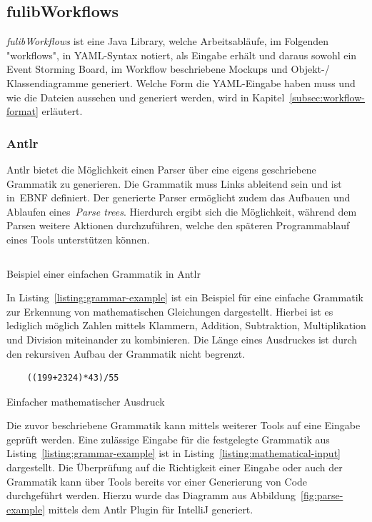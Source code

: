 \subsection{fulibWorkflows}\label{subsec:fulibworkflows}
\textit{fulibWorkflows} ist eine Java Library, welche Arbeitsabläufe, im Folgenden "workflows", in \ac{YAML}-Syntax notiert, als Eingabe erhält und daraus
sowohl ein Event Storming Board, im Workflow beschriebene Mockups und Objekt-/ Klassendiagramme generiert.
Welche Form die YAML-Eingabe haben muss und wie die Dateien aussehen und generiert werden, wird in Kapitel~\ref{subsec:workflow-format} erläutert.

\subsubsection{Antlr}\label{subsubsec:antlr}
\ac{Antlr} bietet die Möglichkeit einen Parser über eine eigens geschriebene Grammatik zu generieren.
Die Grammatik muss Links ableitend sein und ist in~\ac{EBNF} definiert.
Der generierte Parser ermöglicht zudem das Aufbauen und Ablaufen eines~\textit{Parse trees}.
Hierdurch ergibt sich die Möglichkeit, während dem Parsen weitere Aktionen durchzuführen, welche den späteren Programmablauf eines Tools unterstützen können.

\begin{listing}[!ht]
    \inputminted{antlr}{listings/2.2.1/AntlrExample.g4}
    \caption{Beispiel einer einfachen Grammatik in Antlr}
    \label{listing:grammar-example}
\end{listing}

In Listing~\ref{listing:grammar-example} ist ein Beispiel für eine einfache Grammatik zur Erkennung von mathematischen Gleichungen dargestellt.\cite{antlrOrg}
Hierbei ist es lediglich möglich Zahlen mittels Klammern, Addition, Subtraktion, Multiplikation und Division miteinander zu kombinieren.
Die Länge eines Ausdruckes ist durch den rekursiven Aufbau der Grammatik nicht begrenzt.

\begin{listing}[!ht]
    \begin{verbatim}
    ((199+2324)*43)/55

    \end{verbatim}
    \caption{Einfacher mathematischer Ausdruck}
    \label{listing:mathematical-input}
\end{listing}

Die zuvor beschriebene Grammatik kann mittels weiterer Tools auf eine Eingabe geprüft werden.
Eine zulässige Eingabe für die festgelegte Grammatik aus Listing~\ref{listing:grammar-example} ist in Listing~\ref{listing:mathematical-input} dargestellt.
Die Überprüfung auf die Richtigkeit einer Eingabe oder auch der Grammatik kann über Tools bereits vor einer Generierung von Code durchgeführt werden.
Hierzu wurde das Diagramm aus Abbildung~\ref{fig:parse-example} mittels dem Antlr Plugin für IntelliJ generiert.


